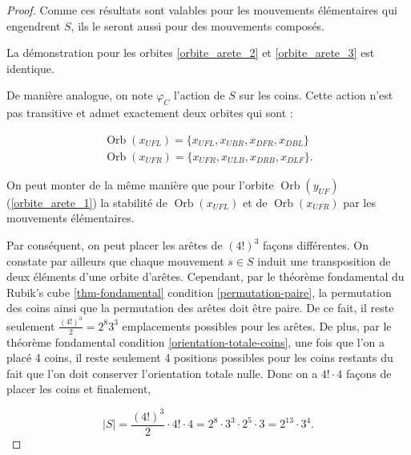 \documentclass[french]{report}
\begin{document}
\begin{proof}
  Comme ces résultats sont valables pour les mouvements élémentaires qui engendrent $S$, ils le seront aussi pour des mouvements composés.

  La démonstration pour les orbites \ref{orbite_arete_2} et \ref{orbite_arete_3} est identique.






De manière analogue, on note $\varphi_C$ l'action de $S$ sur les coins. Cette action n'est pas transitive et admet exactement deux orbites qui sont :

\begin{gather}
  \operatorname{Orb}(x _{UFL}) = \{ x _{UFL}, x _{UBR}, x _{DFR}, x _{DBL} \} \label{orbite_coins_1} \\
  \operatorname{Orb}(x _{UFR}) = \{ x _{UFR}, x _{ULB}, x _{DRB}, x _{DLF} \} \label{orbite_coins_2} .
\end{gather}

On peut monter de la même manière que pour l'orbite $\operatorname{Orb}(y _{UF})$ (\ref{orbite_arete_1}) la stabilité de $\operatorname{Orb}(x _{UFL})$ et de $\operatorname{Orb}(x _{UFR})$ par les mouvements élémentaires.

Par conséquent, on peut placer les arêtes de $(4!) ^{3}$ façons différentes. On constate par ailleurs que chaque mouvement $s \in S$ induit une transposition de deux éléments d'une orbite d'arêtes. Cependant, par le théorème fondamental du Rubik's cube \ref{thm-fondamental} condition \ref{permutation-paire}, la permutation des coins ainsi que la permutation des arêtes doit être paire. De ce fait, il reste seulement $\frac{(4!)^{3}}{2} = 2 ^{8} 3 ^{3}$ emplacements possibles pour les arêtes. De plus, par le théorème fondamental condition \ref{orientation-totale-coins}, une fois que l'on a placé 4 coins, il reste seulement 4 positions possibles pour les coins restants du fait que l'on doit conserver l'orientation totale nulle. Donc on a $4! \cdot 4$ façons de placer les coins et finalement,

$$\mid S \mid = \frac{(4!)^{3}}{2} \cdot 4! \cdot 4 = 2 ^{8} \cdot 3 ^{3} \cdot 2 ^{5} \cdot 3 = 2 ^{13} \cdot 3 ^{4}. $$

\end{proof}
\end{document}
